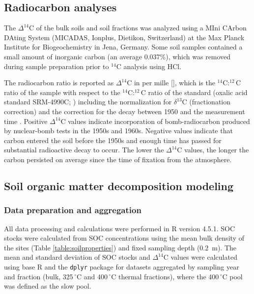 \documentclass[bg, manuscript]{copernicus}
\begin{document}
\subsection{Radiocarbon analyses}
The $\Delta^{14}\text{C}$ of the bulk soils and soil fractions was analyzed using a MIni CArbon DAting System (MICADAS, Ionplus, Dietikon, Switzerland) at the Max Planck Institute for Biogeochemistry in Jena, Germany. Some soil samples contained a small amount of inorganic carbon (an average 0.037\%), which was removed during sample preparation prior to $^{14}\text{C}$ analysis using HCl.

The radiocarbon ratio is reported as $\Delta^{14}\text{C}$ in per mille [\permil], which is the $^{14}\text{C}:^{12}\text{C}$ ratio of the sample with respect to the $^{14}\text{C}:^{12}\text{C}$ ratio of the standard (oxalic acid standard SRM-4990C; \citep{Steinhof2017}) including the normalization for $\delta^{13}\text{C}$ (fractionation correction) and the correction for the decay between 1950 and the measurement time \citep{Stuiver1977}. Positive $\Delta^{14}\text{C}$ values indicate incorporation of bomb-radiocarbon produced by nuclear-bomb tests in the 1950s and 1960s. Negative values indicate that carbon entered the soil before the 1950s and enough time has passed for substantial radioactive decay to occur. The lower the $\Delta^{14}\text{C}$ values, the longer the carbon persisted on average since the time of fixation from the atmosphere.

\subsection{Soil organic matter decomposition modeling}

\subsubsection{Data preparation and aggregation}
All data processing and calculations were performed in R version 4.5.1. SOC stocks were calculated from SOC concentrations using the mean bulk density of the sites (Table \ref{table:soilproperties}) and fixed sampling depth (0.2~m). The mean and standard deviation of SOC stocks and $\Delta^{14}\text{C}$ values were calculated using base R and the \texttt{dplyr} package for datasets aggregated by sampling year and fraction (bulk, 325\,$^\circ\text{C}$ and 400\,$^\circ\text{C}$ thermal fractions), where the 400\,$^\circ\text{C}$ pool was defined as the slow pool.
\end{document}

